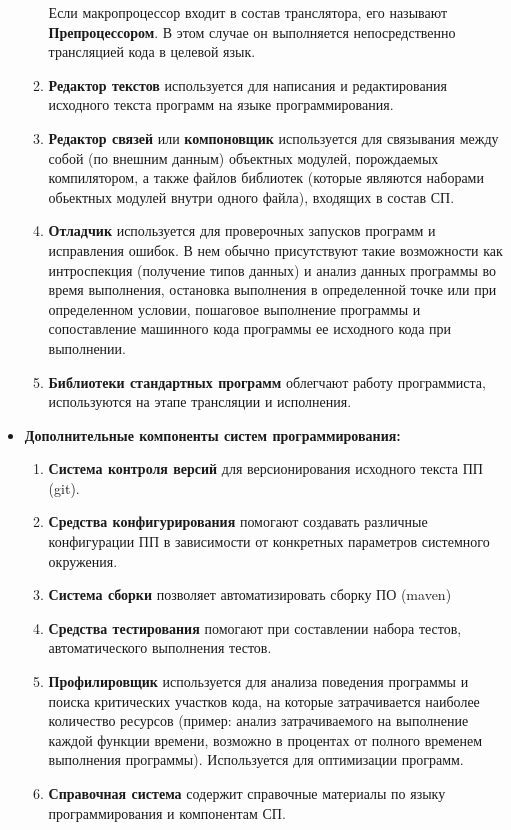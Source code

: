 \begin{itemize}
\begin{enumerate}
        Если макропроцессор входит в состав транслятора, его называют \textbf{Препроцессором}. В этом случае он выполняется непосредственно трансляцией кода в целевой язык.
        \item \textbf{Редактор текстов} используется для написания и редактирования исходного текста программ на языке программирования.
        \item \textbf{Редактор связей} или \textbf{компоновщик} используется для связывания между собой (по внешним данным) объектных модулей, порождаемых компилятором,
        а также файлов библиотек (которые являются наборами обьектных модулей внутри одного файла), входящих в состав СП.
        \item \textbf{Отладчик} используется для проверочных запусков программ и исправления ошибок. В нем обычно присутствуют такие возможности как интроспекция (получение типов данных) и анализ данных программы во время выполнения,
        остановка выполнения в определенной точке или при определенном условии, пошаговое выполнение программы и сопоставление машинного кода программы ее исходного кода при выполнении.
        \item \textbf{Библиотеки стандартных программ} облегчают работу программиста, используются на этапе трансляции и исполнения.
    \end{enumerate}
    \item \textbf{Дополнительные компоненты систем программирования:}
    \begin{enumerate}
        \item \textbf{Система контроля версий} для версионирования исходного текста ПП (git).
        \item \textbf{Средства конфигурирования} помогают создавать различные конфигурации ПП в зависимости от конкретных параметров системного окружения.
        \item \textbf{Система сборки} позволяет автоматизировать сборку ПО (maven)
        \item \textbf{Средства тестирования} помогают при составлении набора тестов, автоматического выполнения тестов.
        \item \textbf{Профилировщик} используется для анализа поведения программы и поиска критических участков кода, на которые затрачивается наиболее количество ресурсов (пример: анализ затрачиваемого на выполнение каждой функции времени, возможно в процентах от полного временем выполнения программы). Используется для оптимизации программ.
        \item \textbf{Справочная система} содержит справочные материалы по языку программирования и компонентам СП.

\end{enumerate}
\end{itemize}
